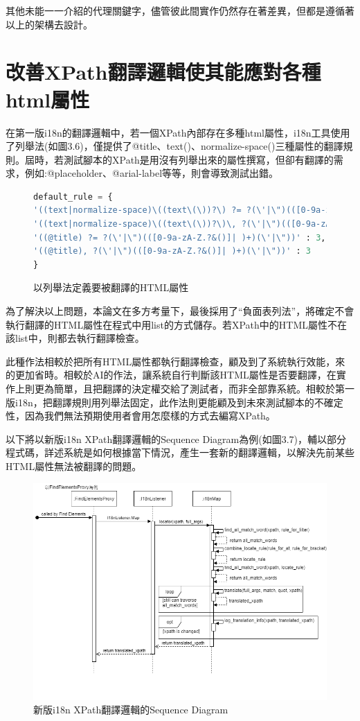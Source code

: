 其他未能一一介紹的代理關鍵字，儘管彼此間實作仍然存在著差異，但都是遵循著以上的架構去設計。

\section{改善XPath翻譯邏輯使其能應對各種html屬性}
在第一版i18n的翻譯邏輯中，若一個XPath內部存在多種html屬性，i18n工具使用了列舉法(如圖3.6)，僅提供了@title、text()、normalize-space()三種屬性的翻譯規則。屆時，若測試腳本的XPath是用沒有列舉出來的屬性撰寫，但卻有翻譯的需求，例如:@placeholder、@arial-label等等，則會導致測試出錯。

\begin{figure}[H]
\begin{lstlisting}[language={python}]
default_rule = {
'((text|normalize-space)\((text\(\))?\) ?= ?(\'|\")(([0-9a-zA-Z.?&()]| )+)(\'|\"))': 4,
'((text|normalize-space)\((text\(\))?\)\, ?(\'|\")(([0-9a-zA-Z.?&()]| )+)(\'|\"))': 4,
'((@title) ?= ?(\'|\")(([0-9a-zA-Z.?&()]| )+)(\'|\"))' : 3,
'((@title), ?(\'|\")(([0-9a-zA-Z.?&()]| )+)(\'|\"))' : 3
}
\end{lstlisting}
\caption{以列舉法定義要被翻譯的HTML屬性}
\end{figure}

為了解決以上問題，本論文在多方考量下，最後採用了“負面表列法”，將確定不會執行翻譯的HTML屬性在程式中用list的方式儲存。若XPath中的HTML屬性不在該list中，則都去執行翻譯檢查。

此種作法相較於把所有HTML屬性都執行翻譯檢查，顧及到了系統執行效能，來的更加省時。相較於AI的作法，讓系統自行判斷該HTML屬性是否要翻譯，在實作上則更為簡單，且把翻譯的決定權交給了測試者，而非全部靠系統。相較於第一版i18n，把翻譯規則用列舉法固定，此作法則更能顧及到未來測試腳本的不確定性，因為我們無法預期使用者會用怎麼樣的方式去編寫XPath。

以下將以新版i18n XPath翻譯邏輯的Sequence Diagram為例(如圖3.7)，輔以部分程式碼，詳述系統是如何根據當下情況，產生一套新的翻譯邏輯，以解決先前某些HTML屬性無法被翻譯的問題。

\begin{figure}[H]
    \includegraphics[width= 1.1\textwidth]{../UML/i18n sequence diagram-xpath翻譯邏輯.png}
    \caption{新版i18n XPath翻譯邏輯的Sequence Diagram}
\end{figure}

